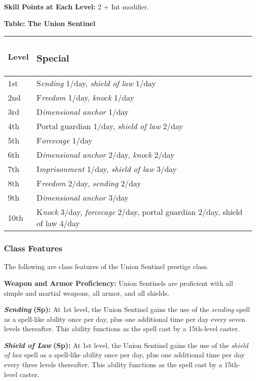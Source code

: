 \documentclass{article}
\begin{document}
\textbf{Skill Points at Each Level:} 2 + Int modifier. 

\vspace{12pt}
\textbf{Table: The Union Sentinel }

\begin{tabular}{|>{\raggedright}p{27pt}|>{\raggedright}p{297pt}|}
\hline
L\textbf{evel} & \subsubsection*{S\textbf{pecial }}\tabularnewline
\hline
1st & S\textit{ending }1/day, \textit{shield of law }1/day \tabularnewline
\hline
2nd & F\textit{reedom }1/day, \textit{knock }1/day \tabularnewline
\hline
3rd & D\textit{imensional anchor }1/day \tabularnewline
\hline
4th & Portal guardian 1/day, \textit{shield of law }2/day \tabularnewline
\hline
5th & F\textit{orcecage }1/day \tabularnewline
\hline
6th & D\textit{imensional anchor }2/day, \textit{knock }2/day \tabularnewline
\hline
7th & I\textit{mprisonment }1/day, \textit{shield of law }3/day \tabularnewline
\hline
8th & F\textit{reedom }2/day, \textit{sending }2/day \tabularnewline
\hline
9th & D\textit{imensional anchor }3/day \tabularnewline
\hline
10th & K\textit{nock }3/day, \textit{forcecage }2/day, portal guardian 2/day, shield 
of law 4/day \tabularnewline
\hline
\end{tabular}

\vspace{12pt}
\subsubsection*{\textbf{Class Features}}

The following are class features of the Union Sentinel prestige class. 

\textbf{Weapon and Armor Proficiency:} Union Sentinels are proficient with all 
simple and martial weapons, all armor, and all shields. 

\textit{\textbf{Sending }}\textbf{(Sp):} At 1st level, the Union Sentinel gains 
the use of the \textit{sending }spell as a spell-like ability once per day, plus 
one additional time per day every seven levels thereafter. This ability functions 
as the spell cast by a 15th-level caster. 

\textit{\textbf{Shield of Law }}\textbf{(Sp):} At 1st level, the Union Sentinel 
gains the use of the \textit{shield of law }spell as a spell-like ability once 
per day, plus one additional time per day every three levels thereafter. This ability 
functions as the spell cast by a 15th-level caster. 
\end{document}
